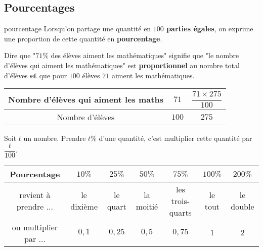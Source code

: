   
\begin{pageCours}
\section{Pourcentages}

\begin{DefT}{pourcentage}
Lorsqu'on partage une quantité en \textbf{$100$ parties égales}, on exprime une proportion de cette quantité en \textbf{pourcentage}.
\end{DefT}

\begin{Ex}
Dire que "$71\%$ des élèves aiment les mathématiques" signifie que "le nombre d'élèves qui aiment les mathématiques" est \textbf{proportionnel} au nombre total d'élèves \textbf{et} que pour $100$ élèves $71$ aiment les mathématiques.

\begin{center}
\begin{tabular}{|c|c|c|}\hline
Nombre d'élèves qui aiment les maths  & $71$ & $\dfrac{71 \times 275}{100}$ \\\hline
Nombre d'élèves & $100$ & $275$ \\\hline
\end{tabular}
\end{center}
\end{Ex}

\begin{Pp}
Soit $t$ un nombre. Prendre $t\%$ d'une quantité, c'est multiplier cette quantité par $\dfrac{t}{100}$.
\end{Pp}

\vspace{0.2cm}


\begin{center}
\begin{tabular}{|c|c|c|c|c|c|c|}\hline
Pourcentage & $10\%$ & $25\%$ & $50\%$ & $75\%$ & $100\%$ & $200\%$  \\\hline
revient à prendre ... & le dixième & le quart & la moitié & les trois-quarts & le tout & le double \\\hline
ou multiplier par ... & $0,1$ & $0,25$ & $0,5$ & $0,75$ & $1$ & $2$ \\\hline
\end{tabular}
\end{center}



\end{pageCours}
